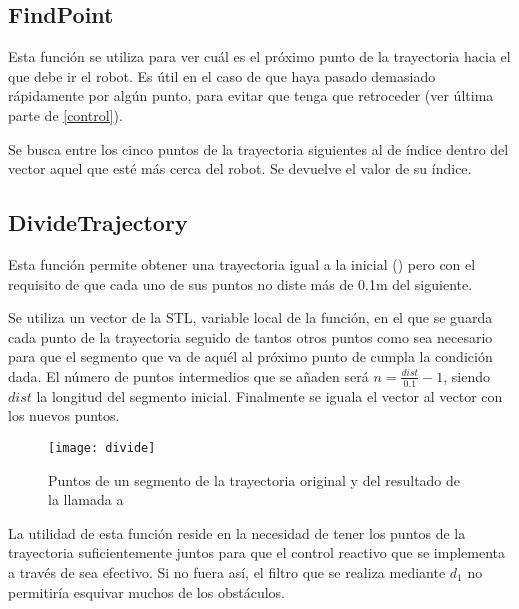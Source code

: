 \subsection{FindPoint}

\noindent
{}

\noindent
Esta función se utiliza para ver cuál es el próximo punto de la trayectoria hacia el que debe ir el robot. Es útil en el caso de que haya pasado demasiado rápidamente por algún punto, para evitar que tenga que retroceder (ver última parte de \ref{control}).

\noindent
Se busca entre los cinco puntos de la trayectoria siguientes al de índice  dentro del vector  aquel que esté más cerca del robot. Se devuelve el valor de su índice.

\subsection{DivideTrajectory}

\noindent
{}

\noindent
Esta función permite obtener una trayectoria igual a la inicial () pero con el requisito de que cada uno de sus puntos no diste más de 0.1m del siguiente.


\noindent
Se utiliza un vector de la STL, variable local de la función, en el que se guarda cada punto de la trayectoria seguido de tantos otros puntos como sea necesario para que el segmento que va de aquél al próximo punto de  cumpla la condición dada. El número de puntos intermedios que se añaden será $n = \frac{dist}{0.1} - 1$, siendo $dist$ la longitud del segmento inicial. Finalmente se iguala el vector  al vector con los nuevos puntos.

\begin{figure}[h]
  \centering\texttt{[image: divide]}\\
  \caption{Puntos de un segmento de la trayectoria original y del resultado de la llamada a }\label{fg:divide}
\end{figure}

\vspace{0.2cm}

\noindent
La utilidad de esta función reside en la necesidad de tener los puntos de la trayectoria suficientemente juntos para que el control reactivo que se implementa a través de  sea efectivo. Si no fuera así, el filtro que se realiza mediante $d_{1}$ no permitiría esquivar muchos de los obstáculos.

